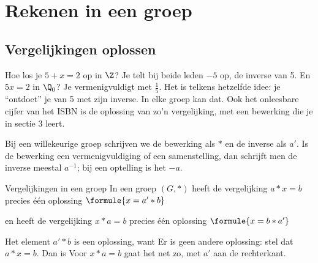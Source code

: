 
\begin{oefeningen}
\end{oefeningen}

\section{Rekenen in een groep}

\subsection{Vergelijkingen oplossen}

Hoe los je $5 + x = 2$ op in $\Z$? Je telt bij beide leden $-5$ op, de inverse van 5. En $5x = 2$ in $\Q_0$? Je vermenigvuldigt met $\frac15$. Het is telkens hetzelfde idee: je ``ontdoet'' je van 5 met zijn inverse. In elke groep kan dat. Ook het onleesbare cijfer van het ISBN is de oplossing van zo'n vergelijking, met een bewerking die je in sectie 3 leert.

Bij een willekeurige groep schrijven we de bewerking als $\ast$ en de inverse als $a'$. Is de bewerking een vermenigvuldiging of een samenstelling, dan schrijft men de inverse meestal $a^{-1}$; bij een optelling is het $-a$.

\begin{theorie}
\begin{stelling}{Vergelijkingen in een groep}
In een groep $(G, \ast)$ heeft de vergelijking $a \ast x = b$ precies één oplossing \quad $\formule{x = a' \ast b}$

\vspace{1mm}
en heeft de vergelijking $x \ast a = b$ precies één oplossing \quad $\formule{x = b \ast a'}$
\end{stelling}

\begin{bewijs}
Het element $a' \ast b$ is een oplossing, want
Er is geen andere oplossing: stel dat $a \ast x = b$. Dan is
Voor $x \ast a = b$ gaat het net zo, met $a'$ aan de rechterkant.
\end{bewijs}
\end{theorie}

